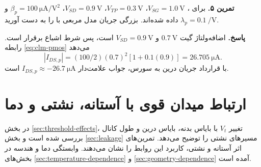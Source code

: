 \textbf{تمرین ۵.}
برای ، \(V_{SG}=\qty{1.0}{\volt}\)،
\(V_{TP}=\qty{0.3}{\volt}\)، \(V_{SD}=\qty{0.9}{\volt}\)،
\(\beta_p=\qty{100}{\micro\ampere\per\volt\squared}\) و
\(\lambda_p=\qty{0.1}{\per\volt}\) داده شده‌اند.
بزرگی جریان مدل مربعی با  را به دست آورید.

\textbf{پاسخ.}
اضافه‌ولتاژ گیت \(\qty{0.7}{\volt}\) و
\(V_{SD}=\qty{0.9}{\volt}\) است، پس شرط اشباع برقرار است.
رابطه \eqref{eq:clm-pmos} می‌دهد
\[
 |I_{DS,p}|=(100/2)(0.7)^2[1+0.1(0.9)]
 =\qty{26.705}{\micro\ampere}.
\]
با قرارداد جریان درین به سورس، جواب علامت‌دار
\(I_{DS,p}\approx-\qty{26.7}{\micro\ampere}\) است.

\section*{ارتباط میدان قوی با آستانه، نشتی و دما}
در بخش \ref{sec:threshold-effects}، تغییر \(V_t\) با بایاس بدنه، بایاس
درین و طول کانال بررسی شده است و بخش \ref{sec:leakage} مسیرهای نشتی
را توضیح می‌دهد. تمرین‌های اثر آستانه و نشتی، کاربرد این روابط را نشان می‌دهند.
وابستگی دما و هندسه در بخش‌های \ref{sec:temperature-dependence} و
\ref{sec:geometry-dependence} آمده است.
